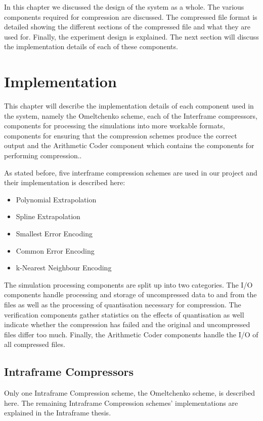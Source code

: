 \documentclass[a4paper,11pt]{report}
\begin{document}
In this chapter we discussed the design of the system as a whole. The various components required for compression are discussed. The compressed file format is detailed showing the different sections of the compressed file and what they are used for. Finally, the experiment design is explained. The next section will discuss the implementation details of each of these components.

\chapter{Implementation}

This chapter will describe the implementation details of each component used in the system, namely the Omeltchenko scheme, each of the Interframe compressors, components for processing the simulations into more workable formats, components for ensuring that the compression schemes produce the correct output and the Arithmetic Coder component which contains the components for performing compression.. 

As stated before, five interframe compression schemes are used in our project and their implementation is described here:
\begin{itemize}
 \item Polynomial Extrapolation
 \item Spline Extrapolation
 \item Smallest Error Encoding
 \item Common Error Encoding 
 \item k-Nearest Neighbour Encoding
\end{itemize}

The simulation processing components are split up into two categories. The I/O components handle processing and storage of uncompressed data to and from the files as well as the processing of quantisation necessary for compression. The verification components gather statistics on the effects of quantisation as well indicate whether the compression has failed and the original and uncompressed files differ too much. Finally, the Arithmetic Coder components handle the I/O of all compressed files.

\section{Intraframe Compressors}

Only one Intraframe Compression scheme, the Omeltchenko scheme, is described here. The remaining Intraframe Compression schemes' implementations are explained in the Intraframe thesis\cite{kegcomp}.
\end{document}
